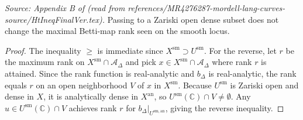 \begin{lemma}
  \label{lem:betti_rank_zar_open_app}
  \textit{Source: Appendix B of \cite{MR4276287-mordell-lang-curves} (read from references/MR4276287-mordell-lang-curves-source/HtIneqFinalVer.tex).}
  Passing to a Zariski open dense subset does not change the maximal Betti-map
  rank seen on the smooth locus.
\end{lemma}

\begin{proof}
  The inequality \(\ge\) is immediate since \(X^{\mathrm{sm}} \supset U^{\mathrm{sm}}\).
  For the reverse, let \(r\) be the maximum rank on \(X^{\mathrm{sm}} \cap \mathcal{A}_\Delta\)
  and pick \(x \in X^{\mathrm{sm}} \cap \mathcal{A}_\Delta\) where rank \(r\) is attained.
  Since the rank function is real-analytic and \(b_\Delta\) is real-analytic, the rank
  equals \(r\) on an open neighborhood \(V\) of \(x\) in \(X^{\mathrm{sm}}\).
  Because \(U^{\mathrm{sm}}\) is Zariski open and dense in \(X\), it is analytically dense
  in \(X^{\mathrm{an}}\), so \(U^{\mathrm{sm}}(\mathbb{C}) \cap V \ne \emptyset\).
  Any \(u \in U^{\mathrm{sm}}(\mathbb{C}) \cap V\) achieves rank \(r\)
  for \(b_\Delta|_{U^{\mathrm{sm,an}}}\), giving the reverse inequality.
\end{proof}

